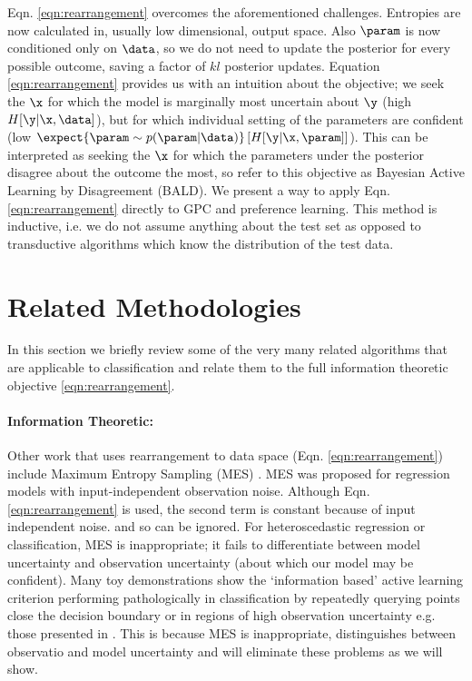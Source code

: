 Eqn. \eqref{eqn:rearrangement} overcomes the aforementioned challenges. Entropies are now calculated in, usually low dimensional, output space. Also $\param$ is now conditioned only on $\data$, so we do not need to update the posterior for every possible outcome, saving a factor of $kl$ posterior updates. Equation \eqref{eqn:rearrangement} provides us with an intuition about the objective; we seek the $\x$ for which the model is marginally most uncertain about $\y$ (high $H[\y \vert \x, \data]$), but for which individual setting of the parameters are confident (low $\expect{\param\sim p(\param|\data)} \left[ H[\y \vert \x,\param] \right]$). This can be interpreted as seeking the $\x$ for which the parameters under the posterior disagree about the outcome the most, so refer to this objective as Bayesian Active Learning by Disagreement (BALD). We present a way to apply Eqn. \eqref{eqn:rearrangement} directly to GPC and preference learning. This method is inductive, i.e. we do not assume anything about the test set as opposed to transductive algorithms which know the distribution of the test data.

\section{Related Methodologies}

In this section we briefly review some of the very many related algorithms that are applicable to classification and relate them to the full information theoretic objective \eqref{eqn:rearrangement}.

\paragraph{Information Theoretic:} Other work that uses rearrangement to data space (Eqn. \eqref{eqn:rearrangement}) include Maximum Entropy Sampling (MES) \citep{sebastiani2000}. MES was proposed for regression models with input-independent observation noise. Although Eqn. \eqref{eqn:rearrangement} is used, the second term is constant because of input independent noise. and so can be ignored. For heteroscedastic regression or classification, MES is inappropriate; it fails to differentiate between model uncertainty and observation uncertainty (about which our model may be confident). Many toy demonstrations show the `information based' active learning criterion performing pathologically in classification by repeatedly querying points close the decision boundary or in regions of high observation uncertainty  e.g. those presented in \citep{dasgupta2008, huang2010}. This is because MES is inappropriate, \ourmethod distinguishes between observatio and model uncertainty and will eliminate these problems as we will show.

